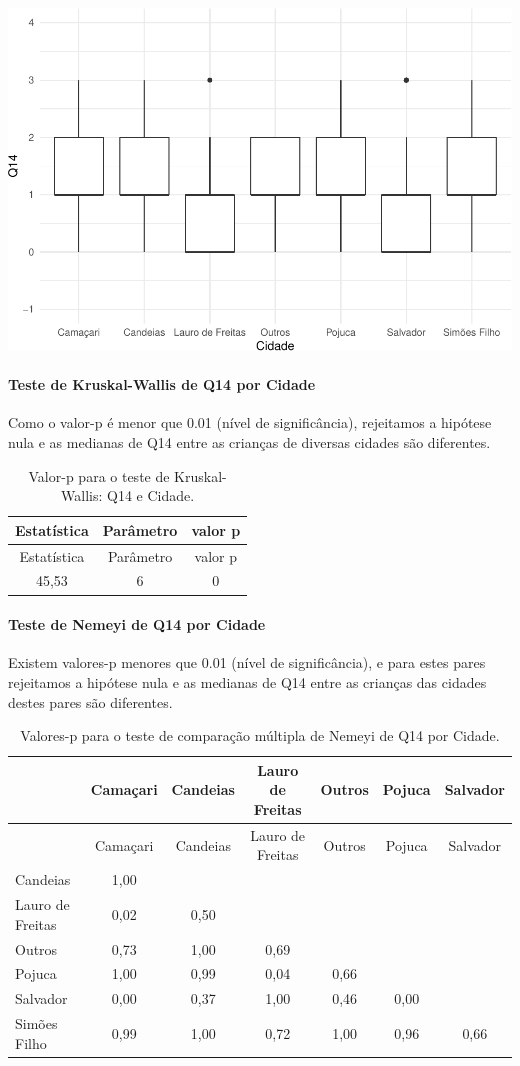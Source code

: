 \documentclass[]{article}
\let\oldparagraph\paragraph
\renewcommand{\paragraph}[1]{\oldparagraph{#1}\mbox{}}
\begin{document}
\begin{center}\includegraphics[width=0.75\linewidth]{relatorio_teste_files/figure-latex/unnamed-chunk-17-1} \end{center}

\hypertarget{teste-de-kruskal-wallis-de-q14-por-cidade}{%
\paragraph{Teste de Kruskal-Wallis de Q14 por Cidade}\label{teste-de-kruskal-wallis-de-q14-por-cidade}}

Como o valor-p é menor que 0.01 (nível de significância), rejeitamos a hipótese nula e as medianas de Q14 entre as crianças de diversas cidades são diferentes.

\begin{longtable}[]{@{}ccc@{}}
\caption{\label{tab:unnamed-chunk-19}Valor-p para o teste de Kruskal-Wallis: Q14 e Cidade.}\tabularnewline
\toprule
Estatística & Parâmetro & valor p\tabularnewline
\midrule
\endfirsthead
\toprule
Estatística & Parâmetro & valor p\tabularnewline
\midrule
\endhead
45,53 & 6 & 0\tabularnewline
\bottomrule
\end{longtable}

\hypertarget{teste-de-nemeyi-de-q14-por-cidade}{%
\paragraph{Teste de Nemeyi de Q14 por Cidade}\label{teste-de-nemeyi-de-q14-por-cidade}}

Existem valores-p menores que 0.01 (nível de significância), e para estes pares rejeitamos a hipótese nula e as medianas de Q14 entre as crianças das cidades destes pares são diferentes.

\begin{longtable}[]{@{}lcccccc@{}}
\caption{\label{tab:unnamed-chunk-21}Valores-p para o teste de comparação múltipla de Nemeyi de Q14 por Cidade.}\tabularnewline
\toprule
& Camaçari & Candeias & Lauro de Freitas & Outros & Pojuca & Salvador\tabularnewline
\midrule
\endfirsthead
\toprule
& Camaçari & Candeias & Lauro de Freitas & Outros & Pojuca & Salvador\tabularnewline
\midrule
\endhead
Candeias & 1,00 & & & & &\tabularnewline
Lauro de Freitas & 0,02 & 0,50 & & & &\tabularnewline
Outros & 0,73 & 1,00 & 0,69 & & &\tabularnewline
Pojuca & 1,00 & 0,99 & 0,04 & 0,66 & &\tabularnewline
Salvador & 0,00 & 0,37 & 1,00 & 0,46 & 0,00 &\tabularnewline
Simões Filho & 0,99 & 1,00 & 0,72 & 1,00 & 0,96 & 0,66\tabularnewline
\bottomrule
\end{longtable}
\end{document}
